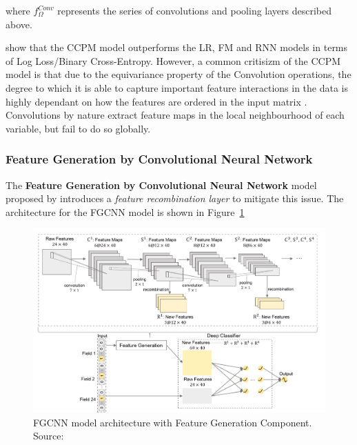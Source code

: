 \documentclass{mldsmsc}
\begin{document}
where $f_{\Omega}^{Conv}$ represents the series of convolutions and pooling layers described above.

\cite{RefWorks:liu2015convolutional} show that the CCPM model outperforms the LR, FM and RNN models
in terms of Log Loss/Binary Cross-Entropy. However, a common critisizm of the CCPM model is that
due to the equivariance property of the Convolution operations, the degree to which it is able to capture
important feature interactions in the data is highly dependant on how the features are ordered in the
input matrix \citep{RefWorks:zhang2021deep,RefWorks:qu2018product-based,RefWorks:gu2021ad}. Convolutions
by nature extract feature maps in the local neighbourhood of each variable, but fail to do so globally.

\subsubsection{Feature Generation by Convolutional Neural Network}

The \textbf{Feature Generation by Convolutional Neural Network} model proposed by \cite{RefWorks:liu2019feature}
introduces a \emph{feature recombination layer} to mitigate this issue.
The architecture for the FGCNN model is shown in Figure~\ref{fig:fgcnn}

\begin{figure}[h]
    \centering
    \includegraphics[width=\textwidth]{../figures/fgcnn.png}
    \caption{FGCNN model architecture with Feature Generation Component. Source: \citep{RefWorks:liu2019feature}}
    \label{fig:fgcnn}
\end{figure}
\end{document}
